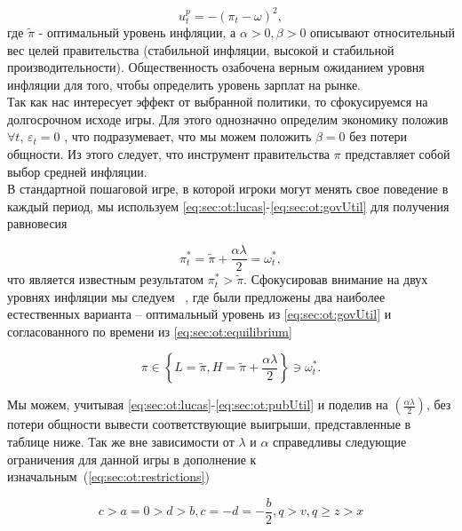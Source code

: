 \begin{equation}
\label{eq:sec:ot:pubUtil}
u^p_t=-(\pi_t - \omega)^2,
\end{equation}
где $\tilde{\pi}$ - оптимальный уровень инфляции, а $\alpha > 0, \beta > 0$ описывают относительный вес целей правительства (стабильной инфляции, высокой и стабильной производительности). Общественность озабочена верным ожиданием уровня инфляции для того, чтобы определить уровень зарплат на рынке. 
\\

Так как нас интересует эффект от выбранной политики, то сфокусируемся на долгосрочном исходе игры. Для этого однозначно определим экономику положив $\forall t$,      $\varepsilon_t=0$ , что подразумевает, что мы можем положить $\beta=0$ без потери общности. Из этого следует, что инструмент правительства $\pi$  представляет собой выбор средней инфляции.
\\

В стандартной пошаговой игре, в которой игроки могут менять свое поведение в каждый период, мы используем \eqref{eq:sec:ot:lucas}-\eqref{eq:sec:ot:govUtil} для получения равновесия

\begin{equation}
\label{eq:sec:ot:equilibrium}
\pi^*_t= \tilde{\pi} + \frac{\alpha\lambda}{2}= \omega^*_t,
\end{equation}
что является известным результатом $\pi^*_t > \tilde{\pi}$. Сфокусировав внимание на двух уровнях инфляции мы следуем ~\cite{ChoiAndMacui96InflationFinancialMarkets}, где были предложены два наиболее естественных варианта – оптимальный уровень из \eqref{eq:sec:ot:govUtil} и согласованного по времени из \eqref{eq:sec:ot:equilibrium}

\begin{equation}
\label{eq:sec:ot:optimal}
\pi \in \left\{L=\tilde{\pi}, H=\tilde{\pi}+\frac{\alpha\lambda}{2} \right\} \ni \omega^*_t.
\end{equation}

Мы можем, учитывая \eqref{eq:sec:ot:lucas}-\eqref{eq:sec:ot:pubUtil} и поделив на $\left(\frac{\alpha\lambda}{2}\right)$,  без потери общности вывести соответствующие выигрыши, представленные в таблице ниже. Так же вне зависимости от $\lambda$ и  $\alpha$ справедливы следующие ограничения для данной игры в дополнение к изначальным~(\ref{eq:sec:ot:restrictions})

\begin{equation}
	\label{eq:sec:ot:constraint}
	c>a=0 > d > b,c=-d=-\frac{b}{2}, q>v,q\ge z>x
\end{equation}

